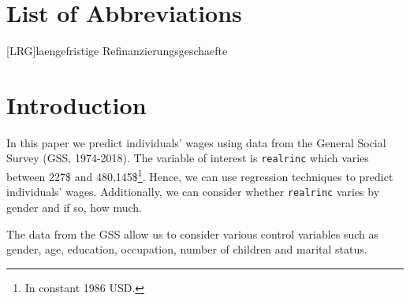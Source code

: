\documentclass[11pt,a4paper]{article}
\let\rmarkdownfootnote\footnote%
\def\footnote{\protect\rmarkdownfootnote}
\begin{document}
\newpage
\listoffigures
{}

\listoftables
{}

\section*{List of Abbreviations}

\begin{adjustwidth}{1.5em}{0pt}

\begin{acronym}[dummyyyy]
 [LRG]{laengefristige Refinanzierungsgeschaefte}

\end{acronym}

\end{adjustwidth}

\restoregeometry

\newpage
{}
\hypertarget{introduction}{%
\section{Introduction}\label{introduction}}

In this paper we predict individuals' wages using data from the General
Social Survey (GSS, 1974-2018). The variable of interest is
\texttt{realrinc} which varies between 227\$ and
480,145\$\footnote{In constant 1986 USD.}. Hence, we can use regression
techniques to predict individuals' wages. Additionally, we can consider
whether \texttt{realrinc} varies by gender and if so, how much.

The data from the GSS allow us to consider various control variables
such as gender, age, education, occupation, number of children and
marital status.
\end{document}
